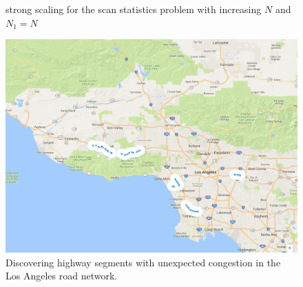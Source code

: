 \begin{figure}[!htb]
\begin{minipage}{0.32\textwidth}
        \caption{\ouralgo{} strong scaling for the scan statistics problem with increasing $N$ and $N_1=N$}
        \label{fig:fig-perf-scan-speedup-N=N1.pdf}
    \end{minipage}  
    \hspace{0mm}
    \begin{minipage}{0.32\textwidth}
        \centering
        \includegraphics[width=1\textwidth]{img/traffic-example.png}
        \caption{Discovering highway segments with unexpected congestion in the Los Angeles road network.}
        \label{fig:traffic}
    \end{minipage}  
\end{figure}


